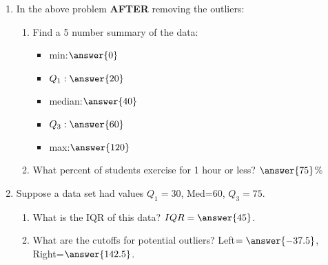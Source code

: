 \documentclass{ximera}
\begin{document}
\begin{enumerate}
\item In the above problem \textbf{AFTER} removing the outliers:
\begin{enumerate}
\item Find a 5 number summary of the data:
\begin{itemize}
\item min:$\answer{0}$
\item $Q_1:\answer{20}$
\item median:$\answer{40}$
\item $Q_3:\answer{60}$
\item max:$\answer{120}$
\end{itemize}
\item What percent of students exercise for 1 hour or less? $\answer{75}$\%
\end{enumerate}
\item Suppose a data set had values $Q_1=30$, Med=$60$, $Q_3=75$.
\begin{enumerate}
\item What is the IQR of this data? $IQR=\answer{45}$.
\item What are the cutoffs for potential outliers?  Left$=\answer{-37.5}$, Right=$\answer{142.5}$.

\end{enumerate}

\end{enumerate}





 
 
 
 
      
\end{document}
